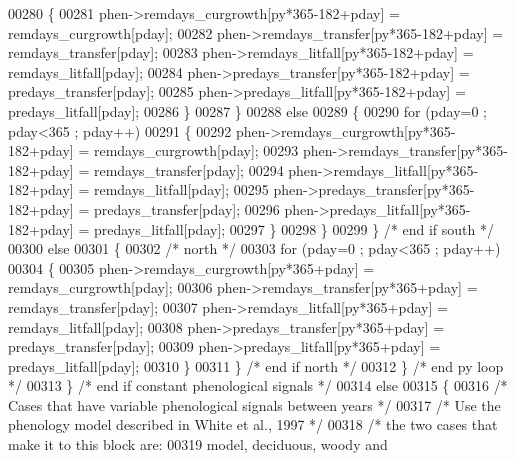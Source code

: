 \begin{DoxyCode}
{{00280                     \{
00281                         phen->remdays\_curgrowth[py*365-182+pday] = remdays\_curgrowth[pday];
00282                         phen->remdays\_transfer[py*365-182+pday] = remdays\_transfer[pday];
00283                         phen->remdays\_litfall[py*365-182+pday] = remdays\_litfall[pday];
00284                         phen->predays\_transfer[py*365-182+pday] = predays\_transfer[pday];
00285                         phen->predays\_litfall[py*365-182+pday] = predays\_litfall[pday];
00286                     \}
00287                 \}
00288                 \textcolor{keywordflow}{else}
00289                 \{
00290                     \textcolor{keywordflow}{for} (pday=0 ; pday<365 ; pday++)
00291                     \{
00292                         phen->remdays\_curgrowth[py*365-182+pday] = remdays\_curgrowth[pday];
00293                         phen->remdays\_transfer[py*365-182+pday] = remdays\_transfer[pday];
00294                         phen->remdays\_litfall[py*365-182+pday] = remdays\_litfall[pday];
00295                         phen->predays\_transfer[py*365-182+pday] = predays\_transfer[pday];
00296                         phen->predays\_litfall[py*365-182+pday] = predays\_litfall[pday];
00297                     \}
00298                 \}
00299             \} \textcolor{comment}{/* end if south */}
00300             \textcolor{keywordflow}{else}
00301             \{
00302                 \textcolor{comment}{/* north */}
00303                 \textcolor{keywordflow}{for} (pday=0 ; pday<365 ; pday++)
00304                 \{
00305                     phen->remdays\_curgrowth[py*365+pday] = remdays\_curgrowth[pday];
00306                     phen->remdays\_transfer[py*365+pday] = remdays\_transfer[pday];
00307                     phen->remdays\_litfall[py*365+pday] = remdays\_litfall[pday];
00308                     phen->predays\_transfer[py*365+pday] = predays\_transfer[pday];
00309                     phen->predays\_litfall[py*365+pday] = predays\_litfall[pday];
00310                 \}
00311             \} \textcolor{comment}{/* end if north */}
00312         \} \textcolor{comment}{/* end py loop */}
00313     \} \textcolor{comment}{/* end if constant phenological signals */}
00314     \textcolor{keywordflow}{else}
00315     \{
00316         \textcolor{comment}{/* Cases that have variable phenological signals between years */}
00317         \textcolor{comment}{/* Use the phenology model described in White et al., 1997 */}
00318         \textcolor{comment}{/* the two cases that make it to this block are:}
00319 \textcolor{comment}{        model, deciduous, woody   and}
}}
\end{DoxyCode}
